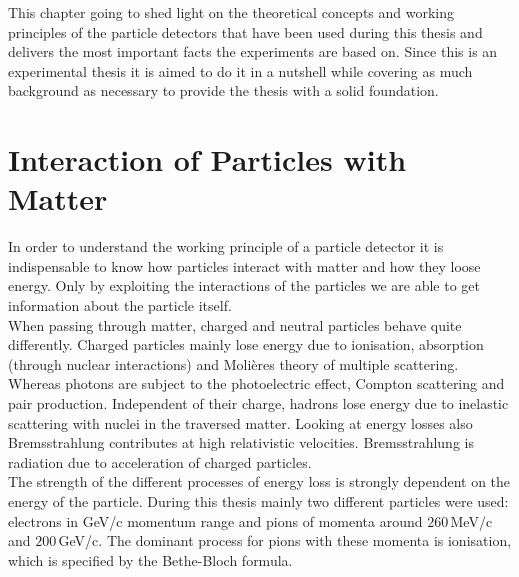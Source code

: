This chapter going to shed light on the theoretical concepts and working principles of the particle detectors that have been used during this thesis and delivers the most important facts the experiments are based on. Since this is an experimental thesis it is aimed to do it in a nutshell while covering as much background as necessary to provide the thesis with a solid foundation.
\section{Interaction of Particles with Matter}
In order to understand the working principle of a particle detector it is indispensable to know how particles interact with matter and how they loose energy. Only by exploiting the interactions of the particles we are able to get information about the particle itself.\\
When passing through matter, charged and neutral particles behave quite differently. Charged particles mainly lose energy due to ionisation, absorption (through nuclear interactions) and Moli\`eres theory of multiple scattering. Whereas photons are subject to the photoelectric effect, Compton scattering and pair production. Independent of their charge, hadrons lose energy due to inelastic scattering with nuclei in the traversed matter. Looking at energy losses also Bremsstrahlung contributes at high relativistic velocities. Bremsstrahlung is radiation due to acceleration of charged particles.\\
The strength of the different processes of energy loss is strongly dependent on the energy of the particle. During this thesis mainly two different particles were used: electrons in GeV/c momentum range and pions of momenta around $260\,$MeV/c and $200\,$GeV/c. The dominant process for pions with these momenta is ionisation, which is specified by the Bethe-Bloch formula.
